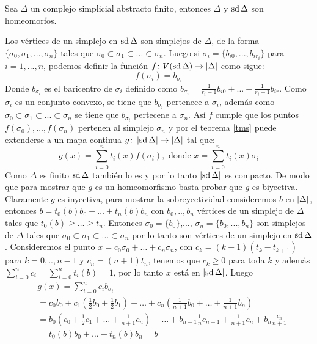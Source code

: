 \begin{Teo}
Sea $\Delta$ un complejo simplicial abstracto finito, entonces $\Delta$ y $\operatorname{sd}\Delta$ son homeomorfos.
\end{Teo}

\begin{Dem}
Los vértices de un simplejo en $\operatorname{sd}\Delta$ son simplejos de $\Delta$, de la forma $\{\sigma_0,\sigma_1,...,\sigma_n\}$ tales que $\sigma_0\subset \sigma_1\subset...\subset\sigma_n$.
Luego si $\sigma_i = \{b_{i0},...,b_{ir_i}\}$ para $i = 1,...,n$, podemos definir la función $f\colon V(\operatorname{sd}\Delta) \rightarrow \left| \Delta \right|$ como sigue:
\begin{equation*}
f(\sigma_{i})= b_{\sigma_{i}}
\end{equation*}
Donde $b_{\sigma_{i}}$ es el baricentro de $\sigma_{i}$ definido como $b_{\sigma_i} = \frac{1}{r_i+1}b_{i0}+...+\frac{1}{r_i+1}b_{ir}$.
Como $\sigma_{i}$ es un conjunto convexo, se tiene que $b_{\sigma_{i}}$ pertenece a $\sigma_{i}$, además como $\sigma_0\subset \sigma_1\subset...\subset\sigma_n$ se tiene que $b_{\sigma_{i}}$ pertecene a $\sigma_{n}$.
Así $f$ cumple que los puntos $f(\sigma_0),...,f(\sigma_n)$ pertenen al simplejo $\sigma_{n}$ y por el teorema \ref{tms} puede extenderse a un mapa continua $g\colon \left| \operatorname{sd}\Delta \right|\rightarrow\left| \Delta \right|$ tal que:
\begin{equation*}
g(x)= \sum_{i=0}^{n}t_i(x)f(\sigma_i), \textrm{ donde }  x= \sum_{i=0}^{n}t_i(x)\sigma_i
\end{equation*}
Como $\Delta$ es finito $\operatorname{sd}\Delta$ también lo es y por lo tanto $\left| \operatorname{sd}\Delta \right|$ es compacto. De modo que para mostrar que $g$ es un homeomorfismo basta probar que $g$ es biyectiva.
Claramente $g$ es inyectiva, para mostrar la sobreyectividad consideremos $b$ en $\left| \Delta \right|$, entonces $b = t_0(b)b_0 +\dots +t_n(b)b_n$ con $b_0,..,b_n$ vértices de un simplejo de $\Delta$ tales que $t_0(b)\geq \dots\geq t_n$.
Entonces $\sigma_0 = \{b_0\}$,..., $\sigma_n = \{b_0,...,b_n\}$ son simplejos de $\Delta$ tales que $\sigma_0\subset \sigma_1\subset...\subset\sigma_n$ por lo tanto son vértices de un simplejo en $\operatorname{sd}\Delta$.
Consideremos el punto $x = c_0\sigma_0+\dots+c_n\sigma_n$, con $c_k = (k+1)(t_k-t_{k+1})$ para $k = 0,..,n-1$ y $c_n = (n+1)t_n$, tenemos que $c_k\geq 0$ para toda $k$ y además 
$\sum_{i= 0}^{n}c_i = \sum_{i = 0}^{n}t_i(b) = 1$, por lo tanto $x$ está en $\left| \operatorname{sd}\Delta \right|$. 
Luego
\begin{align*}
&g(x) = \sum_{i = 0}^{n}c_ib_{\sigma_i}\\
&=c_0b_0 + c_1(\frac{1}{2}b_0 + \frac{1}{2}b_1)+\dots +c_n(\frac{1}{n+1}b_0+\dots +\frac{1}{n+1}b_n)\\
&= b_0(c_0+ \frac{1}{2}c_1+\dots + \frac{1}{n+1}c_n)+\dots +b_{n-1}{\frac{1}{n}c_{n-1}+\frac{1}{n+1}c_n} + b_n\frac{c_n}{n+1}\\
&= t_0(b)b_0+\dots +t_n(b)b_n = b
\end{align*}  
\end{Dem}

